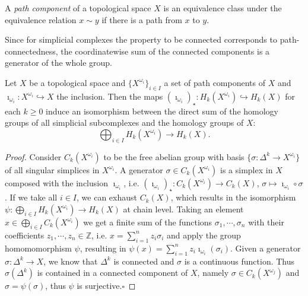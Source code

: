 \documentclass[envcountsect,runningheads]{llncs}
\renewcommand{\qed}{\hfill$\square$}
\begin{document}
\begin{definition}
A \emph{path component} of a topological space $X$ is an equivalence class under the equivalence relation $x \sim y$ if there is a path from $x$ to $y$.
\end{definition}

\begin{remarkdef}
Since for simplicial complexes the property to be connected corresponds to path-connectedness, the coordinatewise sum of the connected components is a generator of the whole group.
\end{remarkdef}

\begin{theorem}{\cite[p.~129]{hatcher2002algebraic}}
Let $X$ be a topological space and $\{X^{\omega_{i}}\}_{i \in I}$ a set of path components of $X$ and $\imath_{\omega_{i}}: X^{\omega_{i}} \hookrightarrow X$ the inclusion. Then the maps $(\imath_{\omega_{i}})_\star: H_k(X^{\omega_{i}}) \hookrightarrow H_k(X)$ for each $k \geq 0$ induce an isomorphism between the direct sum of the homology groups of all simplicial subcomplexes and the homology groups of $X$:
\begin{equation}
	\bigoplus_{i \in I} H_k(X^{\omega_{i}}) \rightarrow H_k(X).
\end{equation}
\end{theorem}

\begin{proof}Consider $C_k(X^{\omega_{i}})$ to be the free abelian group with basis $\{\sigma: \Delta^k \rightarrow X^{\omega_{i}}\}$ of all singular simplices in $X^{\omega_{i}}$. A generator $\sigma \in C_{k}(X^{\omega_{i}})$ is a simplex in $X$ composed with the inclusion $\imath_{\omega_{i}}$, i.e. $(\imath_{\omega_{i}})_\star: C_k(X^{\omega_{i}}) \rightarrow C_k(X)$, $\sigma \mapsto \imath_{\omega_{i}} \circ \sigma$. If we take all $i \in I$, we can exhaust $C_k(X)$, which results in the isomorphism $\psi: \bigoplus_{i \in I} H_k(X^{\omega_{i}}) \rightarrow H_k(X)$ at chain level. Taking an element $x \in \bigoplus_{i \in I} C_k(X^{\omega_{i}})$ we get a finite sum of the functions $\sigma_1, \cdots, \sigma_n$ with their coefficients $z_1, \cdots, z_n \in \mathbb{Z}$, i.e. $x = \sum_{i=1}^{n} z_i\sigma_i$ and apply the group homomomorphism $\psi$, resulting in $\psi(x) = \sum_{i=1}^{n} z_i \imath_{\omega_i}(\sigma_i)$. Given a generator $\sigma: \Delta^k \rightarrow X$, we know that $\Delta^k$ is connected and $\sigma$ is a continuous function. Thus $\sigma(\Delta^k)$ is contained in a connected component of $X$, namely $\sigma \in C_k(X^{\omega_{j}})$ and $\sigma = \psi(\sigma)$, thus $\psi$ is surjective.\qed
\end{proof}
\end{document}
